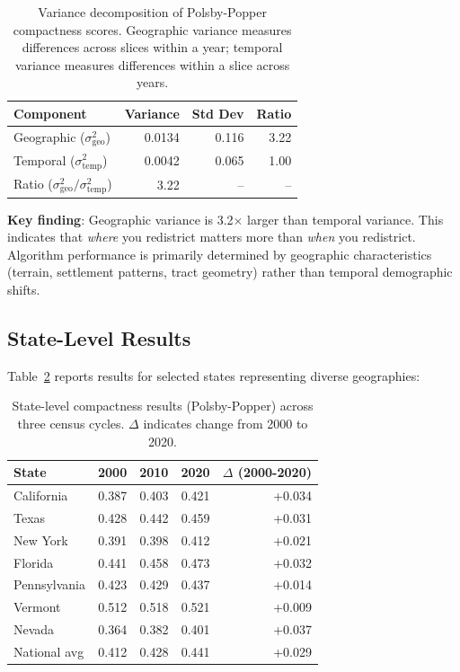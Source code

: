 \begin{table}[t]
\centering
\caption{Variance decomposition of Polsby-Popper compactness scores. Geographic variance measures differences across slices within a year; temporal variance measures differences within a slice across years.}
\label{tab:variance-decomposition}
\begin{tabular}{lrrr}
\toprule
Component & Variance & Std Dev & Ratio \\
\midrule
Geographic ($\sigma^2_{\text{geo}}$) & 0.0134 & 0.116 & 3.22 \\
Temporal ($\sigma^2_{\text{temp}}$) & 0.0042 & 0.065 & 1.00 \\
Ratio ($\sigma^2_{\text{geo}} / \sigma^2_{\text{temp}}$) & 3.22 & -- & -- \\
\bottomrule
\end{tabular}
\end{table}

\textbf{Key finding}: Geographic variance is 3.2× larger than temporal variance. This indicates that \textit{where} you redistrict matters more than \textit{when} you redistrict. Algorithm performance is primarily determined by geographic characteristics (terrain, settlement patterns, tract geometry) rather than temporal demographic shifts.

\subsection{State-Level Results}

Table~\ref{tab:state-results} reports results for selected states representing diverse geographies:

\begin{table}[t]
\centering
\caption{State-level compactness results (Polsby-Popper) across three census cycles. $\Delta$ indicates change from 2000 to 2020.}
\label{tab:state-results}
\begin{tabular}{lrrrr}
\toprule
State & 2000 & 2010 & 2020 & $\Delta$ (2000-2020) \\
\midrule
California & 0.387 & 0.403 & 0.421 & +0.034 \\
Texas & 0.428 & 0.442 & 0.459 & +0.031 \\
New York & 0.391 & 0.398 & 0.412 & +0.021 \\
Florida & 0.441 & 0.458 & 0.473 & +0.032 \\
Pennsylvania & 0.423 & 0.429 & 0.437 & +0.014 \\
Vermont & 0.512 & 0.518 & 0.521 & +0.009 \\
Nevada & 0.364 & 0.382 & 0.401 & +0.037 \\
\midrule
National avg & 0.412 & 0.428 & 0.441 & +0.029 \\
\bottomrule
\end{tabular}
\end{table}

